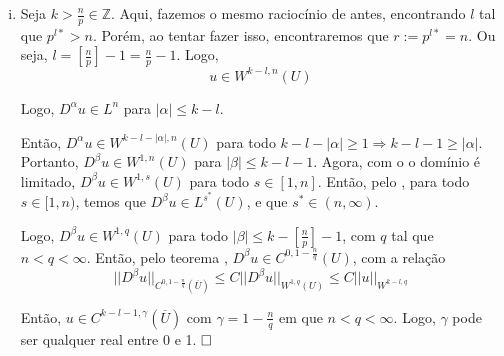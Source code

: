 \documentclass[11pt]{article}
\newcommand{\qed}{$\hfill\square$}
\newcommand{\Z}{\mathbb{Z}}
\begin{document}
\begin{enumerate}[(i)]
	Então, aplicando o  em toda $D^\beta u$ com $|\beta|\leq k-l-1$, temos que $D^\beta u \in C^{0, 1 - \frac{n}{r}}(\overline{U})$, já que $r>n$. Outra interpretação é pensar que se a derivada fraca de uma função é contínua, a função é contínua.
	
	
	
	
	Logo, temos que \[ u \in C^{k-l-1, 1 - \frac{n}{r}}(\overline{U}) \]
	
	Agora, para simplificar, vemos que $ 1-\frac{n}{r} = 1 - \frac{n}{p} + l = \left[\frac{n}{p}\right] + 1 - \frac{n}{p}$ e que $ k-l-1 = k - \left[\frac{n}{p}\right] - 1$. Então, \[ u \in C^{k-\left[\frac{n}{p}\right]-1, \gamma}(\overline{U}) \] para $\gamma = \left[\frac{n}{p}\right] + 1 - \frac{n}{p}$, que é 1 menos a parte decimal de $n/p$.
	
	Para a estimativa da norma, sendo $\gamma = 1 - \frac{n}{r}$,
	\begin{align*}
		||u^*||_{C^{0,\gamma}(\overline{U})} &\leq C ||u||_{W^{1,r}(U)}  \leq C ||u||_{W^{k,p}(U)}\\
		\vdots & \leq \vdots \\
		||D^\beta u^*||_{C^{0,\gamma}(\overline{U})} &\leq C ||D^\beta u||_{W^{1,r}(U)} \leq C ||u||_{W^{k,p}(U)}
	\end{align*}

	Pela definição da norma de Hölder (soma das normas de Hölder para as derivadas). Então, ao somar as desigualdades acima, encontramos
	\[ ||u||_{C^{k-\left[\frac{n}{p}\right]-1, \gamma}(\overline{U})} \leq C ||u||_{W^{k,p}(U)} \]\qed
	
	
	
	\item Seja $k>\frac{n}{p} \in \Z$. Aqui, fazemos o mesmo raciocínio de antes, encontrando $l$ tal que $p^{l*}>n$. Porém, ao tentar fazer isso, encontraremos que $r:= p^{l*}=n$. Ou seja, $l = \left[\frac{n}{p}\right]-1 = \frac{n}{p}-1$. Logo, \[ u \in W^{k-l,n}(U) \]

	Logo, $D^\alpha u \in L^n$ para $|\alpha|\leq k-l$.
	
	Então, $ D^\alpha u \in W^{k-l-|\alpha|,n}(U) $ para todo $k-l-|\alpha|\geq1 \Rightarrow k-l-1 \geq |\alpha|$. Portanto, $D^\beta u \in W^{1,n}(U)$ para $|\beta| \leq k-l-1$. Agora, com o o domínio é limitado, $D^\beta u \in W^{1,s}(U)$ para todo $s \in [1,n]$. Então, pelo , para todo $s \in [1,n)$, temos que $D^\beta u \in L^{s^*}(U)$, e que $s^* \in (n, \infty)$.
	
	Logo, $D^\beta u \in W^{1,q}(U)$ para todo $|\beta| \leq k - \left[\frac{n}{p}\right] - 1$, com $q$ tal que $n<q<\infty$. Então, pelo teorema , $D^\beta u \in C^{0,1 - \frac{n}{q}}(U)$, com a relação \[ ||D^\beta u||_{C^{0,1 - \frac{n}{q}}(\overline{U})} \leq C ||D^\beta u||_{W^{1,q}(U)} \leq C ||u||_{W^{k-l,q}} \]
	
	Então, $ u \in C^{k-l-1,\gamma}(\overline{U}) $ com $\gamma = 1 - \frac{n}{q}$ em que $n < q < \infty$. Logo, $\gamma$ pode ser qualquer real entre 0 e 1. \qed
	
	
\end{enumerate}
\end{document}
